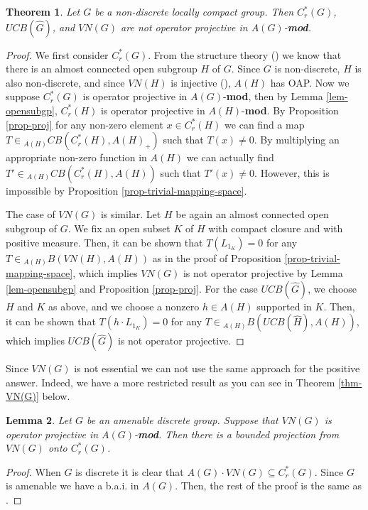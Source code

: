 \documentclass[10pt]{amsart}
\newtheorem{thm}{Theorem}
\newtheorem{lem}[thm]{Lemma}
\numberwithin{thm}{section}
\numberwithin{equation}{section}
\begin{document}
	\begin{thm}\label{thm-notproj-Cr(G)}
	Let $G$ be a non-discrete locally compact group.
	Then $C^*_r(G)$, $UCB(\widehat{G})$, and $VN(G)$ are not operator projective in $A(G)$-{\bf mod}.
	\end{thm}
\begin{proof}
We first consider $C^*_r(G)$. From the structure theory (\cite[Proposition 12.2.2]{Pa01})
we know that there is an almost connected open subgroup $H$ of $G$.
Since $G$ is non-discrete, $H$ is also non-discrete, and since $VN(H)$ is injective (\cite{Pat}), $A(H)$ has OAP.
Now we suppose $C^*_r(G)$ is operator projective in $A(G)$-{\bf mod},
then by Lemma \ref{lem-opensubgp}, $C^*_r(H)$ is operator projective in $A(H)$-{\bf mod}.
By Proposition \ref{prop-proj} for any non-zero element $x\in C^*_r(H)$ we can find a map $T \in {}_{A(H)} CB(C^*_r(H), A(H)_+)$ such that $T(x)\neq 0$.
By multiplying an appropriate non-zero function in $A(H)$
we can actually find $T' \in {}_{A(H)} CB(C^*_r(H), A(H))$ such that $T'(x)\neq 0$.
However, this is impossible by Proposition \ref{prop-trivial-mapping-space}.

The case of $VN(G)$ is similar. Let $H$ be again an almost connected open subgroup of $G$.
We fix an open subset $K$ of $H$ with compact closure and with positive measure.
Then, it can be shown that $T(L_{1_K}) = 0$ for any $T \in {}_{A(H)} B(VN(H), A(H))$ as in the proof of Proposition \ref{prop-trivial-mapping-space},
which implies $VN(G)$ is not operator projective by Lemma \ref{lem-opensubgp} and Proposition \ref{prop-proj}.
For the case $UCB(\widehat{G})$, we choose $H$ and $K$ as above, and we choose a nonzero $h\in A(H)$ supported in $K$.
Then, it can be shown that $T(h\cdot L_{1_K}) = 0$ for any $T \in {}_{A(H)} B(UCB(\widehat{H}), A(H))$,
which implies $UCB(\widehat{G})$ is not operator projective.

\end{proof}

Since $VN(G)$ is not essential we can not use the same approach for the positive answer.
Indeed, we have a more restricted result as you can see in Theorem \ref{thm-VN(G)} below.

	\begin{lem}\label{lem-proj}
	Let $G$ be an amenable discrete group. Suppose that $VN(G)$ is operator projective in $A(G)$-{\bf mod}.
	Then there is a bounded projection from $VN(G)$ onto $C^*_r(G)$.
	\end{lem}  
\begin{proof}
When $G$ is discrete it is clear that $A(G) \cdot VN(G) \subseteq C^*_r(G)$. Since $G$ is amenable we have a b.a.i. in $A(G)$.
Then, the rest of the proof is the same as \cite[Lemma 3.2]{DP04}.
\end{proof}
\end{document}
